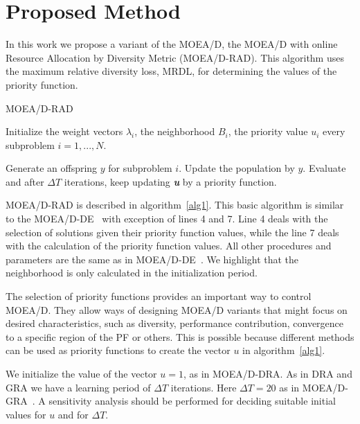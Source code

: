 \section{Proposed Method}
In this work we propose a variant of the MOEA/D, the MOEA/D with online Resource Allocation by Diversity Metric (MOEA/D-RAD). This algorithm uses the maximum relative diversity loss, MRDL, for determining the values of the priority function. 


\begin{algorithm}[h]
	\caption{MOEA/D-RAD}\label{alg1}
	\begin{algorithmic}[1]
		
		\State Initialize the weight vectors $\lambda_i$, the neighborhood $B_i$, the priority value $u_i$ every subproblem $i=1,...,N$.
		
		\State Generate an offspring $y$ for subproblem $i$.
		\State Update the population by $y$.
		\EndIf
		\EndFor
		\State  Evaluate and after $\Delta T$ iterations, keep updating \textit{\textbf{u}} by a priority function.
		\EndWhile
	\end{algorithmic}
\end{algorithm}

MOEA/D-RAD is described in algorithm~\ref{alg1}. This basic algorithm is similar to the MOEA/D-DE~\cite{zhang2009performance} with exception of lines 4 and 7. Line 4 deals with the selection of solutions given their priority function values, while the line 7 deals with the calculation of the priority function values. All other procedures and parameters are the same as in MOEA/D-DE~\cite{li2009multiobjective}. We highlight that the neighborhood is only calculated in the initialization period.


The selection of priority functions provides an important way to control MOEA/D. They allow ways of designing MOEA/D variants that might focus on desired characteristics, such as diversity, performance contribution, convergence to a specific region of the PF or others. This is possible because different methods can be used as priority functions to create the vector $u$ in algorithm~\ref{alg1}. 

We initialize the value of the vector $u=1$, as in MOEA/D-DRA. As in DRA and GRA we have a learning period of $\Delta T$ iterations. Here $\Delta T=20$ as in MOEA/D-GRA~\cite{zhou2016all}. A sensitivity analysis should be performed for deciding suitable initial values for $u$ and for $\Delta T$.

